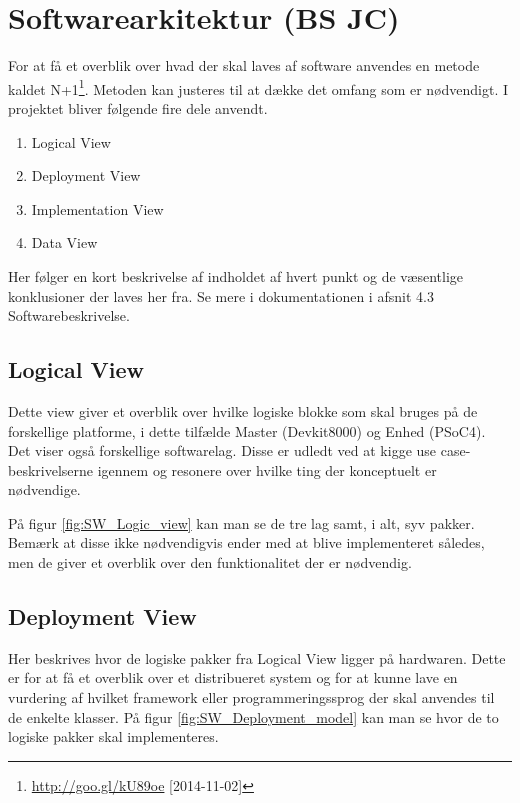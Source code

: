 \section{Softwarearkitektur (BS JC)}

For at få et overblik over hvad der skal laves af software anvendes en metode kaldet N+1\footnote{\url{http://goo.gl/kU89oe} [2014-11-02]}. Metoden kan justeres til at dække det omfang som er nødvendigt. I projektet bliver følgende fire dele anvendt.

\begin{enumerate}
	\item Logical View
	\item Deployment View
	\item Implementation View
	\item Data View
\end{enumerate}

Her følger en kort beskrivelse af indholdet af hvert punkt og de væsentlige konklusioner der laves her fra. Se mere i dokumentationen i afsnit 4.3 Softwarebeskrivelse.

\subsection{Logical View}
Dette view giver et overblik over hvilke logiske blokke som skal bruges på de forskellige platforme, i dette tilfælde Master (Devkit8000) og Enhed (PSoC4). Det viser også forskellige softwarelag. Disse er udledt ved at kigge use case-beskrivelserne igennem og resonere over hvilke ting der konceptuelt er nødvendige.

På figur \ref{fig:SW_Logic_view} kan man se de tre lag samt, i alt, syv pakker. Bemærk at disse ikke nødvendigvis ender med at blive implementeret således, men de giver et overblik over den funktionalitet der er nødvendig.


\subsection{Deployment View}
Her beskrives hvor de logiske pakker fra Logical View ligger på hardwaren. Dette er for at få et overblik over et distribueret system og for at kunne lave en vurdering af hvilket framework eller programmeringssprog der skal anvendes til de enkelte klasser. På figur \ref{fig:SW_Deployment_model} kan man se hvor de to logiske pakker skal implementeres.

